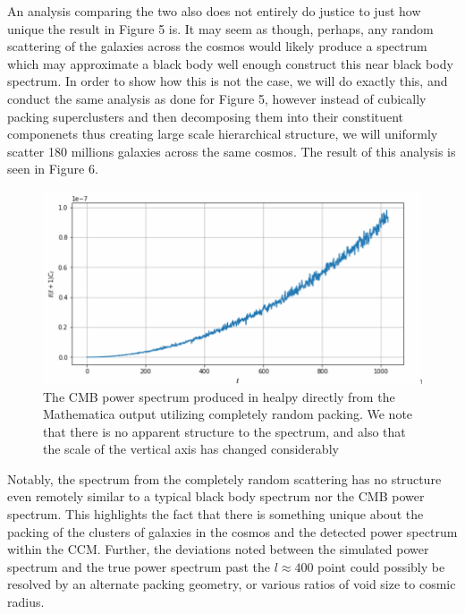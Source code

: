 \documentclass[a4paper]{article}
\begin{document}
    An analysis comparing the two also does not entirely do justice to just how
    unique the result in Figure 5 is. It may seem as though, perhaps, any
    random scattering of the galaxies across the cosmos would likely produce a
    spectrum which may approximate a black body well enough construct this near
    black body spectrum. In order to show how this is not the case, we will do
    exactly this, and conduct the same analysis as done for Figure 5, however
    instead of cubically packing superclusters and then decomposing them into
    their constituent componenets thus creating large scale hierarchical
    structure, we will uniformly scatter 180 millions galaxies across the same
    cosmos. The result of this analysis is seen in Figure 6.

    \begin{figure}[h]
        \centering
        \includegraphics[width=\textwidth]{spectrum_rand_full.png}
        \caption{The CMB power spectrum produced in healpy directly from the
            Mathematica output utilizing completely random packing. We note
            that there is no apparent structure to the spectrum, and also that
            the scale of the vertical axis has changed
            considerably}
    \end{figure}

    Notably, the spectrum from the completely random scattering has no
    structure even remotely similar to a typical black body spectrum nor the
    CMB power spectrum. This highlights the fact that there is something unique
    about the packing of the clusters of galaxies in the cosmos and the
    detected power spectrum within the CCM. Further, the deviations noted
    between the simulated power spectrum and the true power spectrum past the $l
    \approx 400$ point could possibly be resolved by an alternate packing
    geometry, or various ratios of void size to cosmic radius. 
\end{document}
